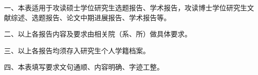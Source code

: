 \begin{CJK*}{UTF8}{gbsn}

一、本表适用于攻读硕士学位研究生选题报告、学术报告，攻读博士学位研究生文献综述、选题报告、论文中期进展报告、学术报告等。

\end{CJK*}


\begin{CJK*}{UTF8}{gbsn}
	
二、以上各报告内容及要求由相关院（系、所）做具体要求。
	
\end{CJK*}

\begin{CJK*}{UTF8}{gbsn}
	
三、以上各报告均须存入研究生个人学籍档案。

\end{CJK*}

\begin{CJK*}{UTF8}{gbsn}
	
四、本表填写要求文句通顺、内容明确、字迹工整。
	
\end{CJK*}

